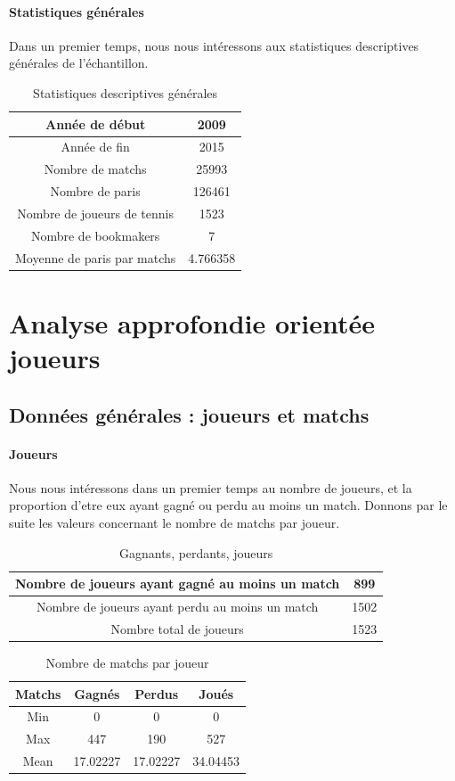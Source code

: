 \documentclass{report}
\begin{document}
\paragraph{Statistiques générales}
Dans un premier temps, nous nous intéressons aux statistiques descriptives générales de l'échantillon.
\begin{table}[h!]
	\centering
	\caption{Statistiques descriptives générales}
	\label{tab:table1}
	\begin{tabular}{c|c}
   		Année de début & 2009\\
   		\hline
   		Année de fin & 2015\\
  		\hline
  		Nombre de matchs & 25993\\
  		\hline
  		Nombre de paris & 126461\\
  		\hline
  		Nombre de joueurs de tennis & 1523\\
      \hline
      Nombre de bookmakers & 7\\
      \hline
      Moyenne de paris par matchs & 4.766358
	\end{tabular}
\end{table}

\section{Analyse approfondie orientée joueurs}
\subsection{Données générales : joueurs et matchs}
\paragraph{Joueurs}
Nous nous intéressons dans un premier temps au nombre de joueurs, et la proportion d'etre eux ayant gagné ou perdu au moins un match. Donnons par le suite les valeurs concernant le nombre de matchs par joueur.
\begin{table}[h!]
	\centering
    \caption{Gagnants, perdants, joueurs}
	\label{tab:table2}
	\begin{tabular}{c|c}
   		Nombre de joueurs ayant gagné au moins un match & 899 \\
   		\hline
   		Nombre de joueurs ayant perdu au moins un match & 1502 \\
  		\hline
  		Nombre total de joueurs & 1523 \\
	\end{tabular}
\end{table}
\begin{table}[h!]
	\centering
	\caption{Nombre de matchs par joueur}
	\label{tab:table3}
	\begin{tabular}{c|c|c|c}
        Matchs & Gagnés & Perdus & Joués\\
   		\hline
   	    Min & 0 & 0 & 0\\
   		\hline
   	    Max & 447 & 190 & 527\\
   		\hline
   	    Mean & 17.02227 & 17.02227 & 34.04453
	\end{tabular}
\end{table}
\end{document}
